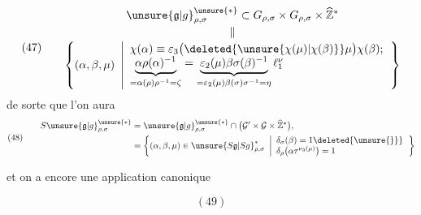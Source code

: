 \[
(47)\qquad
\begin{gathered}
\unsure{\mathfrak{g}|g}_{\rho,\sigma}^{\unsure{*}}
\subset G_{\rho,\sigma}\times G_{\rho,\sigma}
\times\widehat{\mathbb Z}^{*}
\\[-2pt]
\Vert\\[-2pt]
\left\{(\alpha,\beta,\mu)\ \left|
\begin{array}{l}
\chi(\alpha)\equiv\varepsilon_3
\bigl(\deleted{\unsure{\chi(\mu)|\chi(\beta)}}\mu\bigr)
\chi(\beta);\\
\underbrace{\alpha\rho(\alpha)^{-1}}_{=\alpha(\rho)\rho^{-1}=\zeta}
=
\underbrace{\varepsilon_2(\mu)\beta\sigma(\beta)^{-1}}_
{=\varepsilon_2(\mu)\beta(\sigma)\sigma^{-1}=\eta}
\ell_1^\nu
\end{array}\right.\right\}
\end{gathered}
\]
de sorte que l'on aura
\[
(48)\qquad
\begin{aligned}
S\unsure{\mathfrak{g}|g}_{\rho,\sigma}^{\unsure{*}}
&=\unsure{\mathfrak{g}|g}_{\rho,\sigma}^{\unsure{*}}
\cap\bigl(\mathcal{G}'\times\mathcal{G}\times\widehat{\mathbb Z}^{*}\bigr),
\\
&=\left\{(\alpha,\beta,\mu)\in
\unsure{S\mathfrak{g}|Sg}_{\rho,\sigma}^{*}
\ \left|
\begin{array}{l}
\delta_\sigma(\beta)=1\deleted{\unsure{\}}}\\
\delta_\rho\bigl(\alpha\tau^{\nu_3(\mu)}\bigr)=1
\end{array}\right.\right\}
\end{aligned}
\]


et on a encore une application canonique
\begin{samepage}
\[
(49)
\]
\end{samepage}

